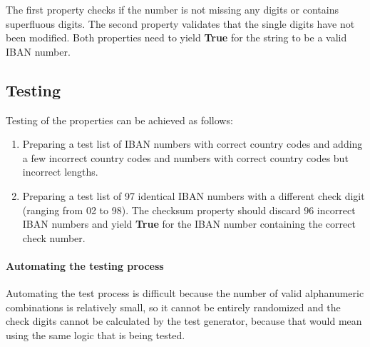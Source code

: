 \documentclass[a4paper]{article}
\begin{document}
The first property checks if the number is not missing any digits or contains superfluous digits. The second property validates that the single digits have not been modified. Both properties need to yield \textbf{True} for the string to be a valid IBAN number.

\subsection{Testing}

Testing of the properties can be achieved as follows:
\begin{enumerate}
\item Preparing a test list of IBAN numbers with correct country codes and adding a few incorrect country codes and numbers with correct country codes but incorrect lengths.
\item Preparing a test list of 97 identical IBAN numbers with a different check digit (ranging from 02 to 98). The checksum property should discard 96 incorrect IBAN numbers and yield \textbf{True} for the IBAN number containing the correct check number.
\end{enumerate}

\paragraph{Automating the testing process}
Automating the test process is difficult because the number of valid alphanumeric combinations is relatively small, so it cannot be entirely randomized and the check digits cannot be calculated by the test generator, because that would mean using the same logic that is being tested.
\end{document}
